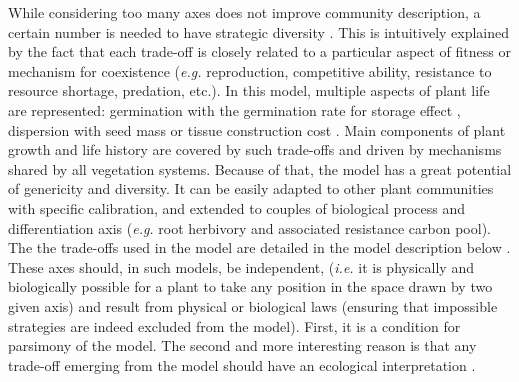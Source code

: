 While considering too many axes does not improve community description, a certain number is needed to have strategic diversity \parencite{laughlin_intrinsic_2014}. This is intuitively explained by the fact that each trade-off is closely related to a particular aspect of fitness or mechanism for coexistence (\textit{e.g.} reproduction, competitive ability, resistance to resource shortage, predation, etc.). In this model, multiple aspects of plant life are represented: germination with the germination rate for storage effect \parencite{chesson_general_2000, adler_climate_2006}, dispersion with seed mass \parencite{westoby_leaf-height-seed_1998} or tissue construction cost \parencite{reich_leaf_1992, wright_worldwide_2004, reich_world-wide_2014}. Main components of plant growth and life history are covered by such trade-offs and driven by mechanisms shared by all vegetation systems. Because of that, the model has a great potential of genericity and diversity. It can be easily adapted to other plant communities with specific calibration, and extended to couples of biological process and differentiation axis (\textit{e.g.} root herbivory and associated resistance carbon pool). The the trade-offs used in the model are detailed in the model description below . These axes should, in such models, be independent, (\textit{i.e.} it is physically and biologically possible for a plant to take any position in the space drawn by two given axis) and result from physical or biological laws (ensuring that impossible strategies are indeed excluded from the model). First, it is a condition for parsimony of the model. The second and more interesting reason is that any trade-off emerging from the model should have an ecological interpretation \parencite{maire_disentangling_2013}. \\
 


